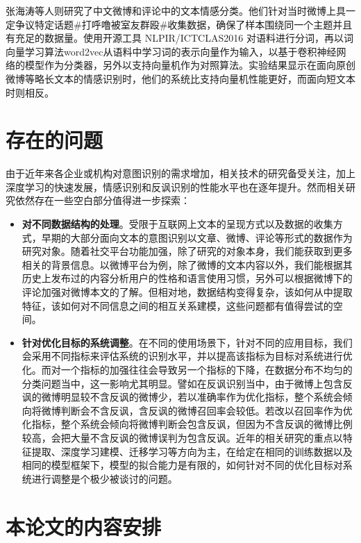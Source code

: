 张海涛等人\cite{zhang2018jiyu}则研究了中文微博和评论中的文本情感分类。他们针对当时微博上具一定争议特定话题\#打呼噜被室友群殴\#收集数据，确保了样本围绕同一个主题并且有充足的数据量。使用开源工具 NLPIR/ICTCLAS2016 对语料进行分词，再以词向量学习算法word2vec从语料中学习词的表示向量作为输入，以基于卷积神经网络的模型作为分类器，另外以支持向量机作为对照算法。实验结果显示在面向原创微博等略长文本的情感识别时，他们的系统比支持向量机性能更好，而面向短文本时则相反。

\section{存在的问题}

由于近年来各企业或机构对意图识别的需求增加，相关技术的研究备受关注，加上深度学习的快速发展，情感识别和反讽识别的性能水平也在逐年提升。然而相关研究依然存在一些空白部分值得进一步探索：

\begin{itemize}

\item {\bf 对不同数据结构的处理}。受限于互联网上文本的呈现方式以及数据的收集方式，早期的大部分面向文本的意图识别以文章、微博、评论等形式的数据作为研究对象。随着社交平台功能加强，除了研究的对象本身，我们能获取到更多相关的背景信息。以微博平台为例，除了微博的文本内容以外，我们能根据其历史上发布过的内容分析用户的性格和语言使用习惯，另外可以根据微博下的评论加强对微博本文的了解。但相对地，数据结构变得复杂，该如何从中提取特征，该如何对不同信息之间的相互关系建模，这些问题都有值得尝试的空间。

\item {\bf 针对优化目标的系统调整}。在不同的使用场景下，针对不同的应用目标，我们会采用不同指标来评估系统的识别水平，并以提高该指标为目标对系统进行优化。而对一个指标的加强往往会导致另一个指标的下降，在数据分布不均匀的分类问题当中，这一影响尤其明显。譬如在反讽识别当中，由于微博上包含反讽的微博明显较不含反讽的微博少，若以准确率作为优化指标，整个系统会倾向将微博判断会不含反讽，含反讽的微博召回率会较低。若改以召回率作为优化指标，整个系统会倾向将微博判断会包含反讽，但因为不含反讽的微博比例较高，会把大量不含反讽的微博误判为包含反讽。近年的相关研究的重点以特征提取、深度学习建模、迁移学习等方向为主，在给定在相同的训练数据以及相同的模型框架下，模型的拟合能力是有限的，如何针对不同的优化目标对系统进行调整是个极少被谈讨的问题。

\end{itemize}

\section{本论文的内容安排}

